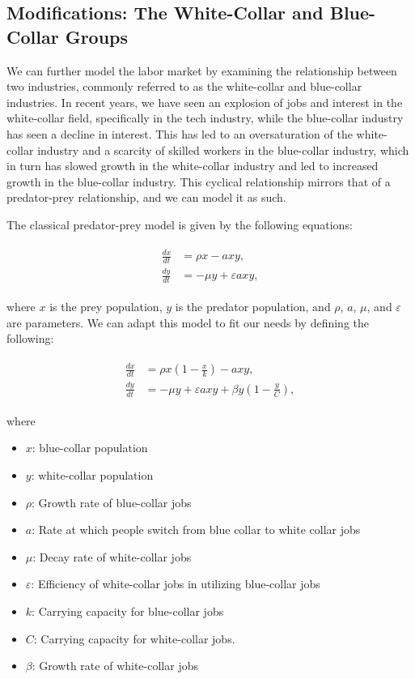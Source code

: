 \documentclass[11pt]{amsart}
\begin{document}
\subsection{Modifications: The White-Collar and Blue-Collar Groups}

We can further model the labor market by examining the relationship between two industries, commonly referred to as the white-collar and blue-collar industries.
In recent years, we have seen an explosion of jobs and interest in the white-collar field, specifically in the tech industry, while the blue-collar industry has seen a decline in interest.
This has led to an oversaturation of the white-collar industry and a scarcity of skilled workers in the blue-collar industry, which in turn has slowed growth in the white-collar industry and led to increased growth in the blue-collar industry.
This cyclical relationship mirrors that of a predator-prey relationship, and we can model it as such.

The classical predator-prey model is given by the following equations:

\begin{align}
    \begin{split}
        \frac{dx}{dt} &= \rho x - a x y, \\
        \frac{dy}{dt} &= -\mu y + \varepsilon a x y,
    \end{split}
\end{align}

where $x$ is the prey population, $y$ is the predator population, and $\rho$, $a$, $\mu$, and $\varepsilon$ are parameters. 
We can adapt this model to fit our needs by defining the following:

\begin{align}
    \begin{split}
        \frac{dx}{dt} &= \rho x \left(1-\frac{x}{k}\right) - a x y, \\
        \frac{dy}{dt} &= -\mu y + \varepsilon a x y + \beta y \left(1-\frac{y}{C}\right),
    \end{split}
\end{align}

where 

\begin{itemize}
    \item $x$: blue-collar population
    \item $y$: white-collar population
    \item $\rho$: Growth rate of blue-collar jobs
    \item $a$: Rate at which people switch from blue collar to white collar jobs
    \item $\mu$: Decay rate of white-collar jobs
    \item $\varepsilon$: Efficiency of white-collar jobs in utilizing blue-collar jobs
    \item $k$: Carrying capacity for blue-collar jobs
    \item $C$: Carrying capacity for white-collar jobs.
    \item $\beta$: Growth rate of white-collar jobs
\end{itemize}
\end{document}
